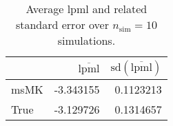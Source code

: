 \begin{table}[H]

\caption{Average lpml and related standard error over $n_{\text{sim}} = 10$ simulations.}
\centering
\begin{tabular}[t]{lrr}
\toprule
  & $\overbar{\text{lpml}}$ & $\text{sd}(\overbar{\text{lpml}})$\\
\midrule
msMK & -3.343155 & 0.1123213\\
True & -3.129726 & 0.1314657\\
\bottomrule
\end{tabular}
\end{table}